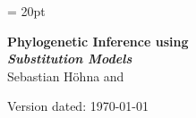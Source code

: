 \documentclass[11pt]{article}
\begin{document}
\renewcommand{\headrulewidth}{0.5pt}
\headsep = 20pt
\lhead{ }

\thispagestyle{plain}
\begin{center}

\textbf{\LARGE Phylogenetic Inference using \RevBayes}\\\vspace{2mm}
\textbf{\it{\Large Substitution Models}}\\\vspace{2mm}
\vspace{1cm}
{\Large Sebastian H{\"o}hna and }
\vspace{1cm}
\end{center}

\def \ResourcePath {./}
\def \GlobalResourcePath {../}


Version dated: \today
\end{document}

